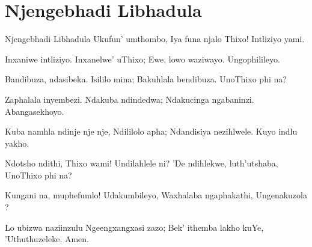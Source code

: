 \starttocol
\chapter{Njengebhadi Libhadula}
\nexttocol
\hfill{\it }
\stoptocol
\starttocol
\startlines
{\sc Njengebhadi} Libhadula
Ukufun' umthombo,
Iya funa njalo Thixo!
Intliziyo yami.

Inxaniwe intliziyo.
Inxanelwe' uThixo;
Ewe, lowo waziwayo.
Ungophilileyo.

Bandibuza, ndasibeka.
Isililo mina;
Bakuhlala bendibuza.
UnoThixo phi na?

Zaphalala inyembezi.
Ndakuba ndindedwa; 
Ndakucinga ngabaninzi.
Abangasekhoyo.

Kuba namhla ndinje nje nje,
Ndililolo apha;
Ndandisiya nezihlwele.
Kuyo indlu yakho.

Ndotsho ndithi, Thixo wami!
Undilahlele ni?
'De ndihlekwe, luth'utshaba,
UnoThixo phi na?

Kungani na, muphefumlo!
Udakumbileyo,
Waxhalaba ngaphakathi,
Ungenakuzola ?

Lo ubizwa naziinzulu
Ngeengxangxasi zazo;
Bek' ithemba lakho kuYe,
'Uthuthuzeleke.  
\hfill          Amen.~~~~~~~~~

\stoplines
\nexttocol

\stoptocol
